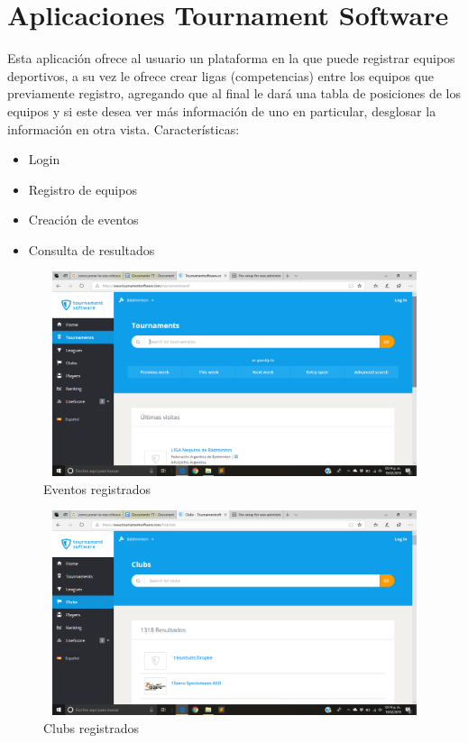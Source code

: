 	\section{Aplicaciones Tournament Software}
	Esta aplicación ofrece al usuario un plataforma en la que puede registrar equipos deportivos, a su vez le ofrece crear ligas (competencias) entre los equipos que previamente registro, agregando que al final le dará una tabla de posiciones de los equipos y si este desea ver más información de uno en particular, desglosar la información en otra vista.
	Características: 
	\begin{itemize}
		\item Login
		\item Registro de equipos
		\item Creación de eventos
		\item Consulta de resultados
	\end{itemize}
	\pagebreak
	\begin{figure}[h]
		\centering
		\includegraphics[width=12cm, height=6cm]{Imagenes/Aplicaciones/ToS1.png}
		\caption{Eventos registrados}
	\end{figure}
	\begin{figure}[h]
		\centering
		\includegraphics[width=12cm, height=6cm]{Imagenes/Aplicaciones/ToS2.png}
		\caption{Clubs registrados}
	\end{figure}
